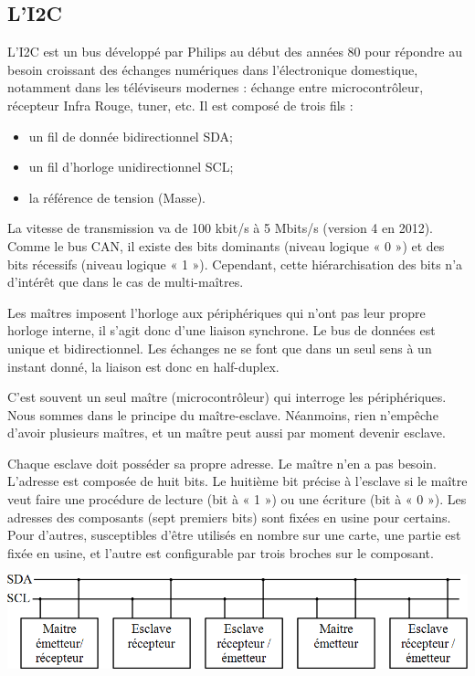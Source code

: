 \documentclass[10pt]{article}
\begin{document}
\subsection{L'I2C}
L’I2C est un bus développé par Philips au début des années 80 pour répondre au besoin croissant des échanges numériques dans l’électronique domestique, notamment dans les téléviseurs modernes : échange entre microcontrôleur, récepteur Infra Rouge, tuner, etc.
Il est composé de trois fils :
\begin{itemize}
\item un fil de donnée bidirectionnel SDA;
\item un fil d’horloge unidirectionnel SCL;
\item la référence de tension (Masse).
\end{itemize}
La vitesse de transmission va de 100 kbit/s à 5 Mbits/s (version 4 en 2012).
Comme le bus CAN, il existe des bits dominants (niveau logique « 0 ») et des bits récessifs (niveau logique « 1 »). Cependant, cette hiérarchisation des bits n’a d’intérêt que dans le cas de multi-maîtres.

Les maîtres imposent l’horloge aux périphériques qui n’ont pas leur propre horloge interne, il s’agit donc d’une liaison synchrone.
Le bus de données est unique et bidirectionnel. Les échanges ne se font que dans un seul sens à un instant donné, la liaison est donc en half-duplex.

C’est souvent un seul maître (microcontrôleur) qui interroge les périphériques. Nous sommes dans le principe du maître-esclave. Néanmoins, rien n’empêche d’avoir plusieurs maîtres, et un maître peut aussi par moment devenir esclave.

Chaque esclave doit posséder sa propre adresse. Le maître n’en a pas besoin. L’adresse est composée de huit bits. Le huitième bit précise à l’esclave si le maître veut faire une procédure de lecture (bit à « 1 ») ou une écriture (bit à « 0 »). Les adresses des composants (sept premiers bits) sont fixées en usine pour certains. Pour d’autres, susceptibles d’être utilisés en nombre sur une carte, une partie est fixée en usine, et l’autre est configurable par trois broches sur le composant. 

\begin{center}
\includegraphics[width=.8\textwidth]{images/fig_21}
\end{center}
\end{document}
